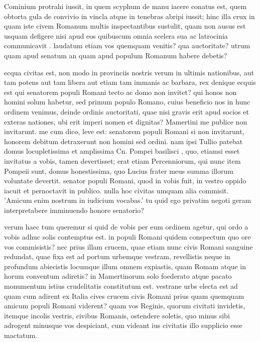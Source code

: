  Cominium protrahi iussit, in quem scyphum de manu iacere conatus est, quem obtorta gula de convivio in vincla atque in tenebras abripi iussit; hinc illa crux in quam iste civem Romanum multis inspectantibus sustulit, quam non ausus est usquam defigere nisi apud eos quibuscum omnia scelera sua ac latrocinia communicavit . laudatum etiam vos quemquam venitis? qua auctoritate? utrum quam apud senatum an quam apud populum Romanum habere debetis?

 ecqua civitas est, non modo in provinciis nostris verum in ultimis nationibus, aut tam potens aut tam libera aut etiam tam immanis ac barbara, rex denique ecquis est qui senatorem populi Romani tecto ac domo non invitet? qui honos non homini solum habetur, sed primum populo Romano, cuius beneficio nos in hunc ordinem venimus, deinde ordinis auctoritati, quae nisi gravis erit apud socios et exteras nationes, ubi erit imperi nomen et dignitas? Mamertini me publice non invitarunt. me cum dico, leve est: senatorem populi Romani si non invitarunt, honorem debitum detraxerunt non homini sed ordini. nam ipsi Tullio patebat domus locupletissima et amplissima Cn. Pompei basilisci , quo, etiamsi esset invitatus a vobis, tamen devertisset; erat etiam Percenniorum, qui nunc item Pompeii sunt, domus honestissima, quo Lucius frater meus summa illorum voluntate devertit. senator populi Romani, quod in vobis fuit, in vestro oppido iacuit et pernoctavit in publico. nulla hoc civitas umquam alia commisit. 'Amicum enim nostrum in iudicium vocabas.' tu quid ego privatim negoti geram interpretabere imminuendo honore senatorio?

 verum haec tum queremur si quid de vobis per eum ordinem agetur, qui ordo a vobis adhuc solis contemptus est. in populi Romani quidem conspectum quo ore vos commisistis? nec prius illam crucem, quae etiam nunc civis Romani sanguine redundat, quae fixa est ad portum urbemque vestram, revellistis neque in profundum abiecistis locumque illum omnem expiastis, quam Romam atque in horum conventum adiretis? in Mamertinorum solo foederato atque pacato monumentum istius crudelitatis constitutum est. vestrane urbs electa est ad quam cum adirent ex Italia cives crucem civis Romani prius quam quemquam amicum populi Romani viderent? quam vos Reginis, quorum civitati invidetis, itemque incolis vestris, civibus Romanis, ostendere soletis, quo minus sibi adrogent minusque vos despiciant, cum videant ius civitatis illo supplicio esse mactatum.

